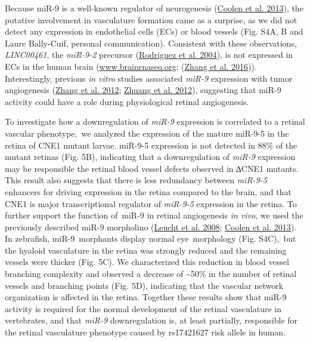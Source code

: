 \documentclass[]{article}
\begin{document}
Because miR-9 is a well-known regulator of neurogenesis
(\protect\hyperlink{_ENREF_4}{Coolen et al. 2013}), the putative
involvement in vasculature formation came as a surprise, as we did not
detect any expression in endothelial cells (ECs) or blood vessels (Fig.
S4A, B and Laure Bally-Cuif, personal communication). Consistent with
these observations, \emph{LINC00461}, the \emph{miR-9-2} precursor
(\protect\hyperlink{_ENREF_25}{Rodriguez et al. 2004}), is not expressed
in ECs in the human brain
(\href{http://www.brainrnaseq.org}{www.brainrnaseq.org};
(\protect\hyperlink{_ENREF_37}{Zhang et al. 2016})). Interestingly,
previous \emph{in vitro} studies associated \emph{miR-9} expression with
tumor angiogenesis (\protect\hyperlink{_ENREF_36}{Zhang et al. 2012};
\protect\hyperlink{_ENREF_38}{Zhuang et al. 2012}), suggesting that
miR-9 activity could have a role during physiological retinal
angiogenesis.

To investigate how a downregulation of \emph{miR-9} expression is
correlated to a retinal vascular phenotype,~we analyzed the expression
of the mature miR-9-5 in the retina of CNE1 mutant larvae. miR-9-5
expression is not detected in 88\% of the mutant retinas (Fig. 5B),
indicating that a downregulation of \emph{miR-9} expression may be
responsible the retinal blood vessel defects observed in ∆CNE1 mutants.
This result also suggests that there is less redundancy between
\emph{miR-9-5} enhancers for driving expression in the retina compared
to the brain, and that CNE1 is major transcriptional regulator of
\emph{miR-9-5} expression in the retina. To further support the function
of~miR-9 in retinal angiogenesis \emph{in vivo}, we used the previously
described miR-9 morpholino (\protect\hyperlink{_ENREF_16}{Leucht et al.
2008}; \protect\hyperlink{_ENREF_4}{Coolen et al. 2013}). In zebrafish,
miR-9~morphants display normal eye~morphology (Fig. S4C),~but the
hyaloid vasculature in the retina was strongly reduced and the remaining
vessels were thicker (Fig. 5C). We characterized this reduction in blood
vessel branching complexity and observed a decrease of
\textasciitilde{}50\% in the number of retinal vessels and branching
points (Fig. 5D), indicating that the vascular network organization is
affected in the retina. Together these results show that miR-9 activity
is required for the normal development of the retinal vasculature in
vertebrates, and that \emph{miR-9} downregulation is, at least
partially, responsible for the retinal vasculature phenotype caused by
rs17421627 risk allele in human.
\end{document}
